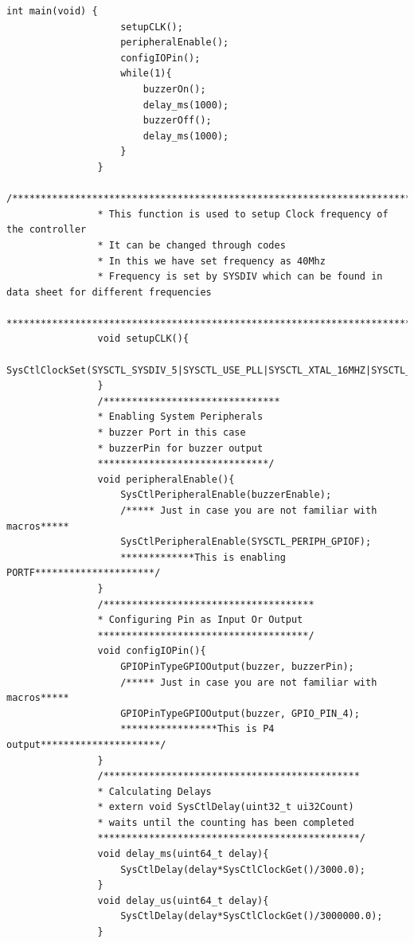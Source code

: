 \documentclass[a4paper,10pt,oneside]{article}
\begin{document}
\begin{lstlisting}[style=CStyle]
				int main(void) {
					setupCLK();
					peripheralEnable();
					configIOPin();
					while(1){
						buzzerOn();
						delay_ms(1000);
						buzzerOff();
						delay_ms(1000);
					}
				}
				/***************************************************************************************
				* This function is used to setup Clock frequency of the controller
				* It can be changed through codes
				* In this we have set frequency as 40Mhz
				* Frequency is set by SYSDIV which can be found in data sheet for different frequencies
				***************************************************************************************/
				void setupCLK(){
					SysCtlClockSet(SYSCTL_SYSDIV_5|SYSCTL_USE_PLL|SYSCTL_XTAL_16MHZ|SYSCTL_OSC_MAIN);
				}
				/*******************************
				* Enabling System Peripherals
				* buzzer Port in this case
				* buzzerPin for buzzer output
				******************************/
				void peripheralEnable(){
					SysCtlPeripheralEnable(buzzerEnable);
					/***** Just in case you are not familiar with macros*****
					SysCtlPeripheralEnable(SYSCTL_PERIPH_GPIOF);
					*************This is enabling PORTF*********************/
				}
				/*************************************
				* Configuring Pin as Input Or Output
				*************************************/
				void configIOPin(){
					GPIOPinTypeGPIOOutput(buzzer, buzzerPin);
					/***** Just in case you are not familiar with macros*****
					GPIOPinTypeGPIOOutput(buzzer, GPIO_PIN_4);
					*****************This is P4 output*********************/
				}
				/*********************************************
				* Calculating Delays
				* extern void SysCtlDelay(uint32_t ui32Count)
				* waits until the counting has been completed
				**********************************************/
				void delay_ms(uint64_t delay){
					SysCtlDelay(delay*SysCtlClockGet()/3000.0);
				}
				void delay_us(uint64_t delay){
					SysCtlDelay(delay*SysCtlClockGet()/3000000.0);
				}
			\end{lstlisting}
			
\end{document}

